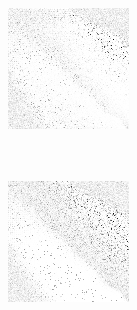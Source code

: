 \begin{figure}
	\begin{subfigure}[t]{0.22\textwidth}
		\center
		\includegraphics[width=\textwidth]{images/findings/experiments/regularization/strats/0.50/crib_min_avg.png}
		\caption{\cribminavg}
	\end{subfigure}
	~
	\begin{subfigure}[t]{0.22\textwidth}
		\center
		\includegraphics[width=\textwidth]{images/findings/experiments/regularization/strats/0.50/pegging_max_avg_gained.png}

\end{subfigure}
\end{figure}
